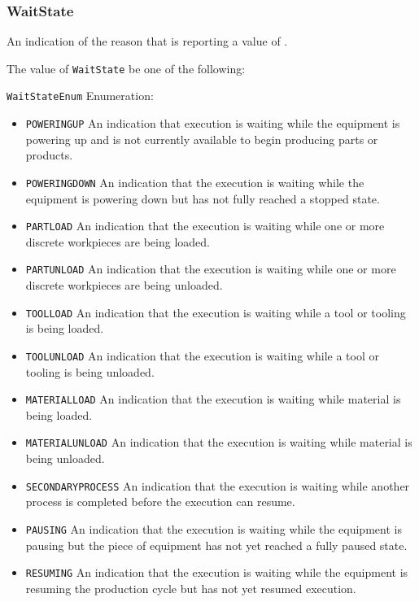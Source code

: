 \subsubsection{WaitState}
\label{sec:WaitState}



An indication of the reason that  is reporting a value of .


The value of \texttt{WaitState} \MUST be one of the following: 


\texttt{WaitStateEnum} Enumeration:

\begin{itemize}
\item \texttt{POWERING\textunderscore UP} \newline An indication that execution is waiting while the equipment is powering up and is not currently available to begin producing parts or products. 
\item \texttt{POWERING\textunderscore DOWN} \newline An indication that the execution is waiting while the equipment is powering down but has not fully reached a stopped state. 
\item \texttt{PART\textunderscore LOAD} \newline An indication that the execution is waiting while one or more discrete workpieces are being loaded. 
\item \texttt{PART\textunderscore UNLOAD} \newline An indication that the execution is waiting while one or more discrete workpieces are being unloaded. 
\item \texttt{TOOL\textunderscore LOAD} \newline An indication that the execution is waiting while a tool or tooling is being loaded. 
\item \texttt{TOOL\textunderscore UNLOAD} \newline An indication that the execution is waiting while a tool or tooling is being unloaded. 
\item \texttt{MATERIAL\textunderscore LOAD} \newline An indication that the execution is waiting while material is being loaded. 
\item \texttt{MATERIAL\textunderscore UNLOAD} \newline An indication that the execution is waiting while material is being unloaded. 
\item \texttt{SECONDARY\textunderscore PROCESS} \newline An indication that the execution is waiting while another process is completed before the execution can resume. 
\item \texttt{PAUSING} \newline An indication that the execution is waiting while the equipment is pausing but the piece of equipment has not yet reached a fully paused state. 
\item \texttt{RESUMING} \newline An indication that the execution is waiting while the equipment is resuming the production cycle but has not yet resumed execution. 
\end{itemize}

